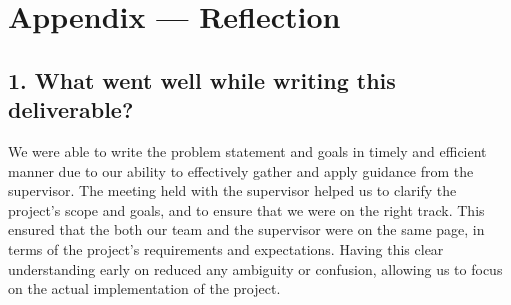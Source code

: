 \documentclass{article}
\begin{document}
\section*{Appendix --- Reflection}

\iffalse
\wss{Not required for CAS 741}
\fi



\subsection*{1. What went well while writing this deliverable?}
We were able to write the problem statement and goals in timely and efficient manner due to our ability to effectively gather and apply guidance from the supervisor. The meeting held with the supervisor helped us to clarify the project's scope and goals, and to ensure that we were on the right track. This ensured that the both our team and the supervisor were on the same page, in terms of the project's requirements and expectations. Having this clear understanding early on reduced any ambiguity or confusion, allowing us to focus on the actual implementation of the project.
\end{document}
